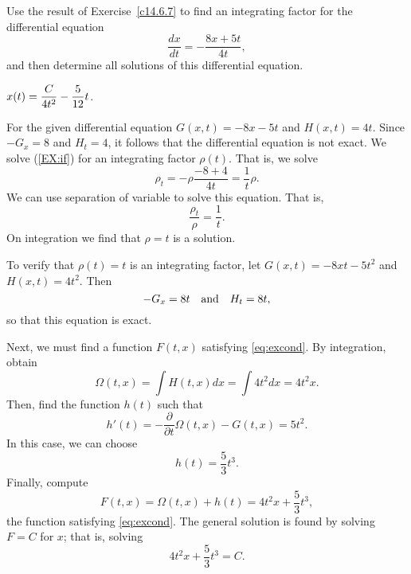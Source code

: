 \documentclass{ximera}
\begin{document}
\begin{exercise} \label{c14.6.7A}
Use the result of Exercise~\ref{c14.6.7} to find an integrating factor for 
the differential equation
\[
\frac{dx}{dt} = -\frac{8x+5t}{4t},
\]
and then determine all solutions of this differential equation.

\begin{solution}
\ans $x(t) = \displaystyle\frac{C}{4t^2} - \frac{5}{12}t$.

\soln  For the given differential equation $G(x,t)=-8x-5t$ and $H(x,t)=4t$. 
Since $-G_x=8$ and $H_t=4$, it follows that the differential equation is not
exact.  We solve (\ref{EX:if}) for an integrating factor $\rho(t)$.  That is,
we solve
\[
\rho_t = -\rho\frac{-8+4}{4t} = \frac{1}{t}\rho.
\]
We can use separation of variable to solve this equation.  That is,
\[
\frac{\rho_t}{\rho} =  \frac{1}{t}.
\]
On integration we find that $\rho=t$ is a solution.

To verify that $\rho(t)=t$ is an integrating factor, let $G(x,t)=-8xt-5t^2$
and $H(x,t)=4t^2$.  Then 
\[
-G_x = 8t \quad\mbox{and}\quad H_t = 8t,
\]
so that this equation is exact.

Next, we must find a function $F(t,x)$ satisfying \eqref{eq:excond}.  By
integration, obtain
\[
\Omega(t,x) = \int H(t,x)dx = \int 4t^2dx = 4t^2x.
\]
Then, find the function $h(t)$ such that
\[
h'(t) = -\frac{\partial}{\partial t}\Omega(t,x) - G(t,x) = 5t^2.
\]
In this case, we can choose 
\[
h(t) =  \frac{5}{3}t^3.  
\]
Finally, compute
\[
F(t,x) = \Omega(t,x) + h(t) = 4t^2x + \frac{5}{3}t^3,
\]
the function satisfying \eqref{eq:excond}.  The general solution is found by 
solving $F=C$ for $x$; that is, solving
\[
4t^2x + \frac{5}{3}t^3 = C.
\]

\end{solution}
\end{exercise}

\CEXER
\end{document}
